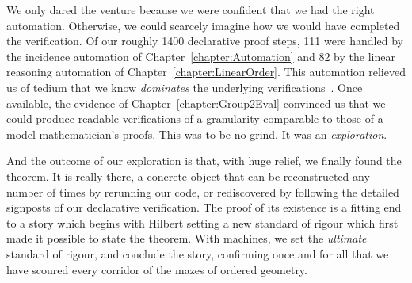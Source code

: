 We only dared the venture because we were confident that we had the right automation. Otherwise, we could scarcely imagine how we would have completed the verification. Of our roughly 1400 declarative proof steps, 111 were handled by the incidence automation of Chapter~\ref{chapter:Automation} and 82 by the linear reasoning automation of Chapter~\ref{chapter:LinearOrder}. This automation relieved us of tedium that we know \emph{dominates} the underlying verifications~\cite{ScottMScThesis}. Once available, the evidence of Chapter~\ref{chapter:Group2Eval} convinced us that we could produce readable verifications of a granularity comparable to those of a model mathematician's proofs. This was to be no grind. It was an \emph{exploration}.

And the outcome of our exploration is that, with huge relief, we finally found the theorem. It is really there, a concrete object that can be reconstructed any number of times by rerunning our code, or rediscovered by following the detailed signposts of our declarative verification. The proof of its existence is a fitting end to a story which begins  with Hilbert setting a new standard of rigour which first made it possible to state the theorem. With machines, we set the \emph{ultimate} standard of rigour, and conclude the story, confirming once and for all that we have scoured every corridor of the mazes of ordered geometry.

